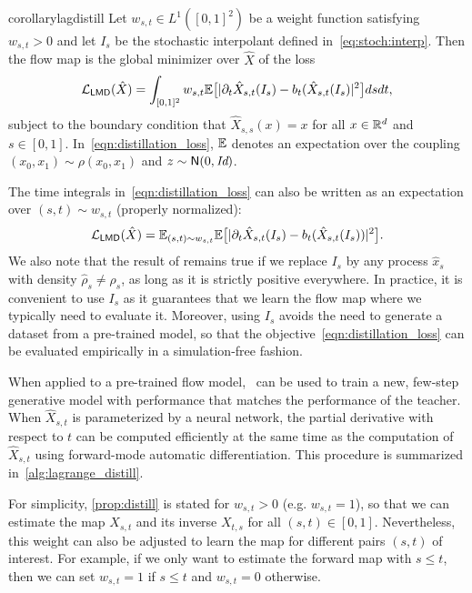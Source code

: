 \begin{restatable}{corollary}{lagdistill}
	\label{prop:distill}
	Let $w_{s,t} \in L^1([0,1]^2)$ be a weight function satisfying $w_{s, t} > 0$ and let $I_s$ be the stochastic interpolant defined in~\cref{eq:stoch:interp}.
	Then the flow map is the global minimizer over $\hat{X}$ of the loss
	\begin{equation}
		\label{eqn:distillation_loss}
		\mathcal{L}_{\mathsf{LMD}}(\hat{X}) = \int_{[0,1]^2}  w_{s,t} \mathbb{E} \big[ |\partial_t \hat{X}_{s, t}(I_s) - b_t(\hat{X}_{s, t}(I_s)|^2\big] dsdt,
	\end{equation}
	subject to the boundary condition that $\hat{X}_{s, s}(x) = x$ for all $x \in \mathbb{R}^d$ and $s \in [0,1]$. In~\eqref{eqn:distillation_loss}, $\mathbb{E}$ denotes an expectation over the coupling $(x_0, x_1) \sim \rho(x_0, x_1)$ and $z \sim \mathsf N(0, \text{\it Id})$.
\end{restatable}
%
The time integrals in~\eqref{eqn:distillation_loss} can also be written as an expectation over $(s,t) \sim w_{s,t}$ (properly normalized):
%
\begin{equation}
	\label{eqn:distillation_loss:2}
	\mathcal{L}_{\mathsf{LMD}}(\hat{X}) = \mathbb{E}_{(s,t)\sim w_{s,t}} \mathbb{E}\big[|\partial_t \hat{X}_{s, t}(I_s) - b_t(\hat{X}_{s, t}(I_s))|^2\big].
\end{equation}
%
We also note that the result of  remains true if we replace $I_s$ by any process $\hat x_s$ with density $\hat \rho_s \not= \rho_s$, as long as it is strictly positive everywhere.
%
In practice, it is convenient to use $I_s$ as it guarantees that we learn the flow map where we typically need to evaluate it.
%
Moreover, using $I_s$ avoids the need to generate a dataset from a pre-trained model, so that the objective~\eqref{eqn:distillation_loss} can be evaluated empirically in a simulation-free fashion.

When applied to a pre-trained flow model,~ can be used to train a new, few-step generative model with performance that matches the performance of the teacher.
%
When $\hat{X}_{s, t}$ is parameterized by a neural network, the partial derivative with respect to $t$ can be computed efficiently at the same time as the computation of $\hat{X}_{s, t
	}$ using forward-mode automatic differentiation.
%
This procedure is summarized in~\cref{alg:lagrange_distill}.

For simplicity, \cref{prop:distill} is stated for $w_{s,t}>0$ (e.g. $w_{s,t}=1$), so that we can estimate the map $X_{s,t}$ and its inverse $X_{t,s}$ for all $(s,t)\in[0,1]$.
%
Nevertheless, this weight can also be adjusted to learn the map for different pairs $(s,t)$ of interest.
For example, if we only want to estimate the forward map with $s\le t$, then we can set $w_{s,t} = 1$ if  $s\le t$ and $w_{s,t} = 0$ otherwise.


